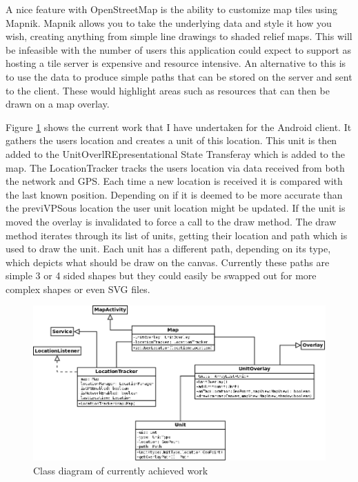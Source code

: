 \documentclass[11pt,fleqn,twoside]{article}
\begin{document}
A nice feature with OpenStreetMap is the ability to customize map tiles using Mapnik. Mapnik allows you to take the underlying data and style it how you wish, creating anything from simple line drawings to shaded relief maps. This will be infeasible with the number of users this application could expect to support as hosting a tile server is expensive and resource intensive. An alternative to this is to use the data to produce simple paths that can be stored on the server and sent to the client. These would highlight areas such as resources that can then be drawn on a map overlay.

Figure \ref{class} shows the current work that I have undertaken for the Android client. It gathers the users location and creates a unit of this location. This unit is then added to the UnitOverlREpresentational State Transferay which is added to the map. The LocationTracker tracks the users location via data received from both the network and GPS. Each time a new location is received it is compared with the last known position. Depending on if it is deemed to be more accurate than the previVPSous location the user unit location might be updated. If the unit is moved the overlay is invalidated to force a call to the draw method. The draw method iterates through its list of units, getting their location and path which is used to draw the unit. Each unit has a different path, depending on its type, which depicts what should be draw on the canvas. Currently these paths are simple 3 or 4 sided shapes but they could easily be swapped out for more complex shapes or even SVG files.

\begin{figure}[H]
\centering
% 
\includegraphics[width=\linewidth]{class}
\caption{Class diagram of currently achieved work}
\label{class}
\end{figure}
\end{document}

